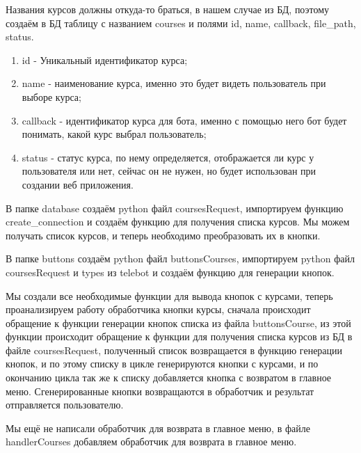 \documentclass[12pt, oldlfont, amsfonts]{report}
\begin{document}
Названия курсов должны откуда-то браться, в нашем случае из БД, поэтому создаём в БД таблицу с названием { courses} и полями { id}, { name}, { callback}, { file\_path}, { status}.

\begin{enumerate}
\item { id} - Уникальный идентификатор курса;
\item { name} - наименование курса, именно это будет видеть пользователь при выборе курса;
\item { callback} - идентификатор курса для бота, именно с помощью него бот будет понимать, какой курс выбрал пользователь;
\item { status} - статус курса, по нему определяется, отображается ли курс у пользователя или нет, сейчас он не нужен, но будет использован при создании веб приложения.
\end{enumerate}	

В папке { database} создаём python файл {coursesRequest}, импортируем функцию { create\_connection} и создаём функцию для получения { списка курсов}. Мы можем получать список курсов, и теперь необходимо преобразовать их в кнопки.

В папке { buttons} создаём python файл { buttonsCourses}, импортируем python файл { coursesRequest} и { types} из telebot и создаём функцию для генерации кнопок.

Мы создали все необходимые функции для вывода кнопок с курсами, теперь проанализируем работу обработчика кнопки { курсы}, сначала происходит обращение к функции генерации кнопок списка из файла { buttonsCourse}, из этой функции происходит обращение к функции для получения списка курсов из БД в файле { coursesRequest}, полученный список возвращается в функцию генерации кнопок, и по этому списку в цикле генерируются кнопки с курсами, и по окончанию цикла так же к списку добавляется кнопка с возвратом в { главное меню}. Сгенерированные кнопки возвращаются в обработчик и результат отправляется пользователю.

Мы ещё не написали обработчик для возврата в главное меню, в файле { handlerCourses} добавляем обработчик для возврата в главное меню.
\end{document}
